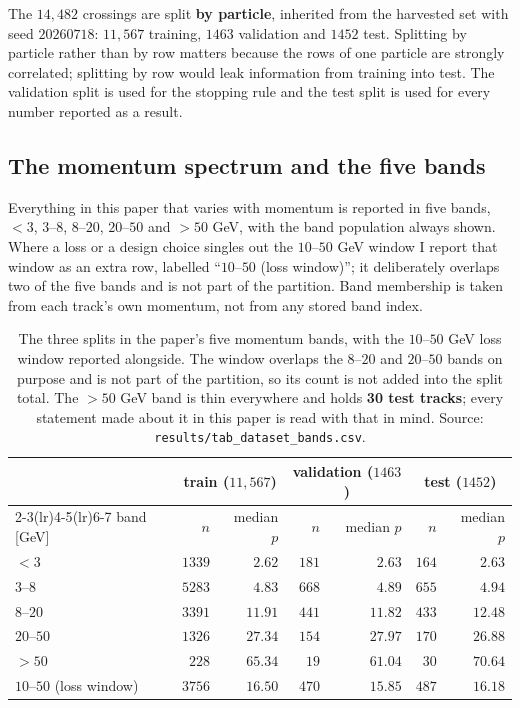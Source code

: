 \documentclass[11pt,a4paper]{article}
\begin{document}
The $14{,}482$ crossings are split \textbf{by particle}, inherited from the
harvested set with seed $20260718$: $11{,}567$ training, $1463$ validation and
$1452$ test. Splitting by particle rather than by row matters because the rows
of one particle are strongly correlated; splitting by row would leak information
from training into test. The validation split is used for the stopping rule and
the test split is used for every number reported as a result.

\subsection{The momentum spectrum and the five bands}
\label{sec:data-bands}

Everything in this paper that varies with momentum is reported in five bands,
$<3$, $3$--$8$, $8$--$20$, $20$--$50$ and $>50$ GeV, with the band population
always shown. Where a loss or a design choice singles out the $10$--$50$ GeV
window I report that window as an extra row, labelled
``$10$--$50$ (loss window)''; it deliberately overlaps two of the five bands and
is not part of the partition. Band membership is taken from each track's own
momentum, not from any stored band index.

\begin{table}[tbp]
  \centering
  \caption{The three splits in the paper's five momentum bands, with the
  $10$--$50$ GeV loss window reported alongside. The window overlaps the
  $8$--$20$ and $20$--$50$ bands on purpose and is not part of the partition, so
  its count is not added into the split total. The $>50$ GeV band is thin
  everywhere and holds \textbf{30 test tracks}; every statement made about it in
  this paper is read with that in mind.
  Source: \texttt{results/tab\_dataset\_bands.csv}.}
  \label{tab:splitbands}
  \small
  \setlength{\tabcolsep}{5pt}
  \begin{tabular}{lrrrrrr}
    \toprule
    & \multicolumn{2}{c}{train ($11{,}567$)} & \multicolumn{2}{c}{validation ($1463$)} & \multicolumn{2}{c}{test ($1452$)} \\
    \cmidrule(lr){2-3}\cmidrule(lr){4-5}\cmidrule(lr){6-7}
    band [GeV] & $n$ & median $p$ & $n$ & median $p$ & $n$ & median $p$ \\
    \midrule
    $<3$        & $1339$ & $2.62$  & $181$ & $2.63$  & $164$ & $2.63$  \\
    $3$--$8$    & $5283$ & $4.83$  & $668$ & $4.89$  & $655$ & $4.94$  \\
    $8$--$20$   & $3391$ & $11.91$ & $441$ & $11.82$ & $433$ & $12.48$ \\
    $20$--$50$  & $1326$ & $27.34$ & $154$ & $27.97$ & $170$ & $26.88$ \\
    $>50$       & $228$  & $65.34$ & $19$  & $61.04$ & $30$  & $70.64$ \\
    \midrule
    $10$--$50$ (loss window) & $3756$ & $16.50$ & $470$ & $15.85$ & $487$ & $16.18$ \\
    \bottomrule
  \end{tabular}
\end{table}
\end{document}
